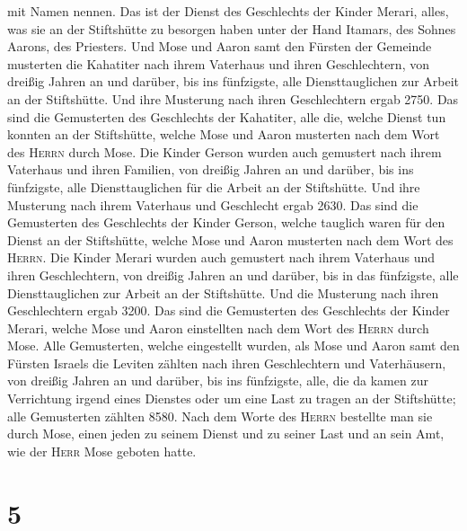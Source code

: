 mit Namen nennen.  Das ist der Dienst des Geschlechts der
Kinder Merari, alles, was sie an der Stiftshütte zu besorgen haben unter
der Hand Itamars, des Sohnes Aarons, des Priesters.  Und
Mose und Aaron samt den Fürsten der Gemeinde musterten die Kahatiter
nach ihrem Vaterhaus und ihren Geschlechtern,  von
dreißig Jahren an und darüber, bis ins fünfzigste, alle Diensttauglichen
zur Arbeit an der Stiftshütte.  Und ihre Musterung nach
ihren Geschlechtern ergab 2750.  Das sind die Gemusterten
des Geschlechts der Kahatiter, alle die, welche Dienst tun konnten an
der Stiftshütte, welche Mose und Aaron musterten nach dem Wort des
\textsc{Herrn} durch Mose.  Die Kinder Gerson wurden auch
gemustert nach ihrem Vaterhaus und ihren Familien,  von
dreißig Jahren an und darüber, bis ins fünfzigste, alle Diensttauglichen
für die Arbeit an der Stiftshütte.  Und ihre Musterung
nach ihrem Vaterhaus und Geschlecht ergab 2630.  Das sind
die Gemusterten des Geschlechts der Kinder Gerson, welche tauglich waren
für den Dienst an der Stiftshütte, welche Mose und Aaron musterten nach
dem Wort des \textsc{Herrn}.  Die Kinder Merari wurden
auch gemustert nach ihrem Vaterhaus und ihren Geschlechtern,
 von dreißig Jahren an und darüber, bis in das
fünfzigste, alle Diensttauglichen zur Arbeit an der Stiftshütte.
 Und die Musterung nach ihren Geschlechtern ergab 3200.
 Das sind die Gemusterten des Geschlechts der Kinder
Merari, welche Mose und Aaron einstellten nach dem Wort des
\textsc{Herrn} durch Mose.  Alle Gemusterten, welche
eingestellt wurden, als Mose und Aaron samt den Fürsten Israels die
Leviten zählten nach ihren Geschlechtern und Vaterhäusern,
 von dreißig Jahren an und darüber, bis ins fünfzigste,
alle, die da kamen zur Verrichtung irgend eines Dienstes oder um eine
Last zu tragen an der Stiftshütte;  alle Gemusterten
zählten 8580.  Nach dem Worte des \textsc{Herrn}
bestellte man sie durch Mose, einen jeden zu seinem Dienst und zu seiner
Last und an sein Amt, wie der \textsc{Herr} Mose geboten hatte.

\hypertarget{section-4}{%
\section{5}\label{section-4}}

